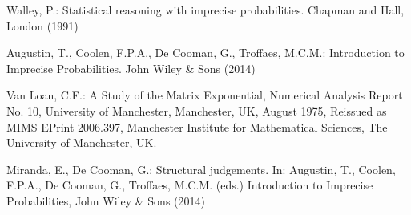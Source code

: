 
% 
%
%
% 
% 
%
\biblstarthook{}

\begin{thebibliography}{99.}%
%
%
%
%
%
%
%


Walley, P.: {Statistical reasoning with imprecise probabilities}. Chapman and Hall, London (1991)

Augustin, T., Coolen, F.P.A., De Cooman, G., Troffaes, M.C.M.: {Introduction to Imprecise Probabilities}. John Wiley \& Sons (2014) 

Van Loan, C.F.: {A Study of the Matrix Exponential}, Numerical Analysis Report No. 10, University of Manchester, Manchester, UK, August 1975, {Reissued as MIMS EPrint 2006.397}, Manchester Institute for Mathematical Sciences, The University of Manchester, UK.

Miranda, E., De Cooman, G.: {Structural judgements}. In: Augustin, T., Coolen, F.P.A., De Cooman, G., Troffaes, M.C.M. (eds.) Introduction to Imprecise Probabilities, {John Wiley \& Sons} (2014) 


\end{thebibliography}

